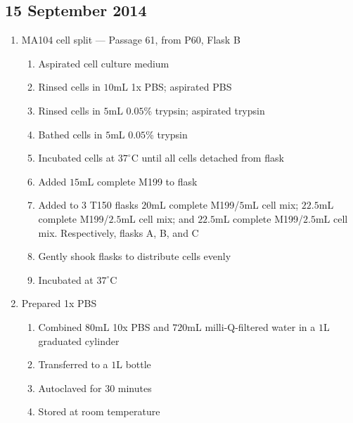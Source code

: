 
\subsection*{15 September 2014}

\begin{enumerate}
	\item MA104 cell split --- Passage 61, from P60, Flask B
		\begin{enumerate}
			\item Aspirated cell culture medium
			\item Rinsed cells in $10$mL 1x PBS; aspirated PBS
			\item Rinsed cells in $5$mL $0.05$\% trypsin; aspirated trypsin
			\item Bathed cells in $5$mL $0.05$\% trypsin
			\item Incubated cells at $37^{\circ}$C until all cells detached from flask
			\item Added $15$mL complete M199 to flask
			\item Added to $3$ T150 flasks $20$mL complete M199/$5$mL cell mix; $22.5$mL complete M199/$2.5$mL cell mix; and $22.5$mL complete M199/$2.5$mL cell mix. Respectively, flasks A, B, and C
			\item Gently shook flasks to distribute cells evenly
			\item Incubated at $37^{\circ}$C
		\end{enumerate}
		
	\item Prepared 1x PBS
		\begin{enumerate}
			\item Combined $80$mL 10x PBS and $720$mL milli-Q-filtered water in a $1$L graduated cylinder
			\item Transferred to a $1$L bottle
			\item Autoclaved for 30 minutes
			\item Stored at room temperature
		\end{enumerate}
		

\end{enumerate}
